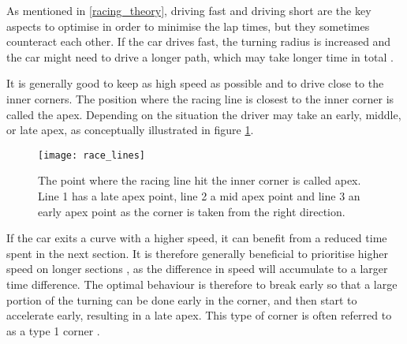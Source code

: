 


As mentioned in \ref{racing_theory}, driving fast and driving short are the key aspects to optimise in order to minimise the lap times, but they sometimes counteract each other. If the car drives fast, the turning radius is increased and the car might need to drive a longer path, which may take longer time in total \cite{edmondson}. 

It is generally good to keep as high speed as possible and to drive close to the inner corners. The position where the racing line is closest to the inner corner is called the apex. Depending on the situation the driver may take an early, middle, or late apex, as conceptually illustrated in figure \ref{figure:apex_variants}.

\begin{figure}
    \centering
    \texttt{[image: race\_lines]}
    \caption{The point where the racing line hit the inner corner is called apex. Line 1 has a late apex point, line 2 a mid apex point and line 3 an early apex point as the corner is taken from the right direction.}
    \label{figure:apex_variants}
\end{figure}

\noindent
If the car exits a curve with a higher speed, it can benefit from a reduced time spent in the next section. It is therefore generally beneficial to prioritise higher speed on longer sections \cite{beckman, edmondson}, as the difference in speed will accumulate to a larger time difference. The optimal behaviour is therefore to break early so that a large portion of the turning can be done early in the corner, and then start to accelerate early, resulting in a late apex. This type of corner is often referred to as a type 1 corner \cite{edmondson}.

